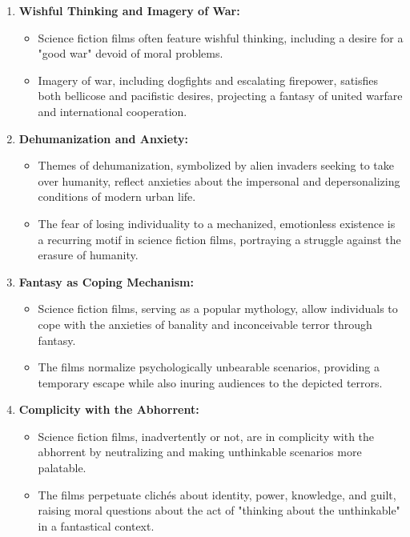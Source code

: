 \documentclass[11pt,fleqn]{book}
\begin{document}
\begin{enumerate}[label=\arabic*.]
\item \textbf{Wishful Thinking and Imagery of War:}
\begin{itemize}
    \item Science fiction films often feature wishful thinking, including a desire for a "good war" devoid of moral problems.
    \item Imagery of war, including dogfights and escalating firepower, satisfies both bellicose and pacifistic desires, projecting a fantasy of united warfare and international cooperation.
\end{itemize}

\item \textbf{Dehumanization and Anxiety:}
\begin{itemize}
    \item Themes of dehumanization, symbolized by alien invaders seeking to take over humanity, reflect anxieties about the impersonal and depersonalizing conditions of modern urban life.
    \item The fear of losing individuality to a mechanized, emotionless existence is a recurring motif in science fiction films, portraying a struggle against the erasure of humanity.
\end{itemize}

\item \textbf{Fantasy as Coping Mechanism:}
\begin{itemize}
    \item Science fiction films, serving as a popular mythology, allow individuals to cope with the anxieties of banality and inconceivable terror through fantasy.
    \item The films normalize psychologically unbearable scenarios, providing a temporary escape while also inuring audiences to the depicted terrors.
\end{itemize}

\item \textbf{Complicity with the Abhorrent:}
\begin{itemize}
    \item Science fiction films, inadvertently or not, are in complicity with the abhorrent by neutralizing and making unthinkable scenarios more palatable.
    \item The films perpetuate clichés about identity, power, knowledge, and guilt, raising moral questions about the act of "thinking about the unthinkable" in a fantastical context.
\end{itemize}
\end{enumerate}
\end{document}
